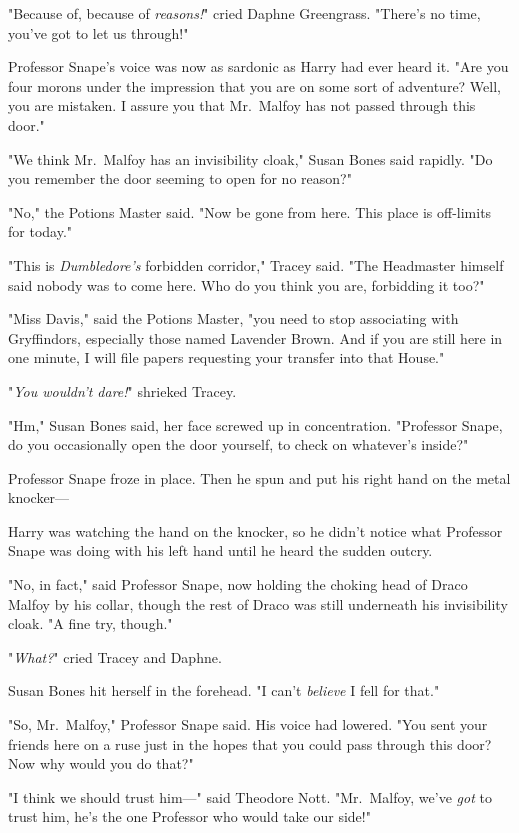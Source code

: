"Because of, because of \emph{reasons!}" cried Daphne Greengrass. "There's no
time, you've got to let us through!"

Professor Snape's voice was now as sardonic as Harry had ever heard it. "Are
you four morons under the impression that you are on some sort of adventure?
Well, you are mistaken. I assure you that Mr.~Malfoy has not passed through
this door."

"We think Mr.~Malfoy has an invisibility cloak," Susan Bones said rapidly. "Do
you remember the door seeming to open for no reason?"

"No," the Potions Master said. "Now be gone from here. This place is off-limits
for today."

"This is \emph{Dumbledore's} forbidden corridor," Tracey said. "The Headmaster
himself said nobody was to come here. Who do you think you are, forbidding it
too?"

"Miss Davis," said the Potions Master, "you need to stop associating with
Gryffindors, especially those named Lavender Brown. And if you are still here
in one minute, I will file papers requesting your transfer into that House."

"\emph{You wouldn't dare!}" shrieked Tracey.

"Hm," Susan Bones said, her face screwed up in concentration. "Professor Snape,
do you occasionally open the door yourself, to check on whatever's inside?"

Professor Snape froze in place. Then he spun and put his right hand on the
metal knocker—

Harry was watching the hand on the knocker, so he didn't notice what Professor
Snape was doing with his left hand until he heard the sudden outcry.

"No, in fact," said Professor Snape, now holding the choking head of Draco
Malfoy by his collar, though the rest of Draco was still underneath his
invisibility cloak. "A fine try, though."

"\emph{What?}" cried Tracey and Daphne.

Susan Bones hit herself in the forehead. "I can't \emph{believe} I fell for
that."

"So, Mr.~Malfoy," Professor Snape said. His voice had lowered. "You sent your
friends here on a ruse{\el} just in the hopes that you could pass through
this door? Now why would you do that?"

"I think we should trust him—" said Theodore Nott. "Mr.~Malfoy, we've
\emph{got} to trust him, he's the one Professor who would take our side!"

